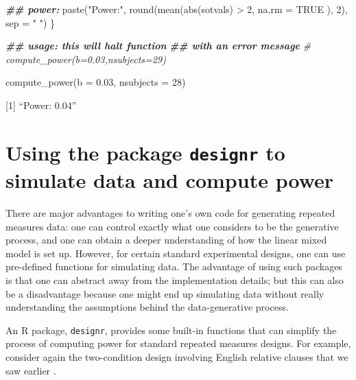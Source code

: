 \documentclass[
  12pt,
]{krantz}
\newenvironment{Shaded}{\begin{snugshade}}{\end{snugshade}}
\newcommand{\AttributeTok}[1]{\textcolor[rgb]{0.77,0.63,0.00}{#1}}
\newcommand{\CommentTok}[1]{\textcolor[rgb]{0.56,0.35,0.01}{\textit{#1}}}
\newcommand{\ConstantTok}[1]{\textcolor[rgb]{0.00,0.00,0.00}{#1}}
\newcommand{\DecValTok}[1]{\textcolor[rgb]{0.00,0.00,0.81}{#1}}
\newcommand{\DocumentationTok}[1]{\textcolor[rgb]{0.56,0.35,0.01}{\textbf{\textit{#1}}}}
\newcommand{\FloatTok}[1]{\textcolor[rgb]{0.00,0.00,0.81}{#1}}
\newcommand{\FunctionTok}[1]{\textcolor[rgb]{0.00,0.00,0.00}{#1}}
\newcommand{\NormalTok}[1]{#1}
\newcommand{\SpecialCharTok}[1]{\textcolor[rgb]{0.00,0.00,0.00}{#1}}
\newcommand{\StringTok}[1]{\textcolor[rgb]{0.31,0.60,0.02}{#1}}
\theoremstyle{definition}
\theoremstyle{definition}
\theoremstyle{definition}
\theoremstyle{definition}
\theoremstyle{remark}
\begin{document}
\begin{Shaded}
\begin{Highlighting}[]
  \DocumentationTok{\#\# power:}
  \FunctionTok{paste}\NormalTok{(}\StringTok{"Power:"}\NormalTok{, }\FunctionTok{round}\NormalTok{(}\FunctionTok{mean}\NormalTok{(}\FunctionTok{abs}\NormalTok{(sotvals) }\SpecialCharTok{\textgreater{}} \DecValTok{2}\NormalTok{,}
    \AttributeTok{na.rm =} \ConstantTok{TRUE}
\NormalTok{  ), }\DecValTok{2}\NormalTok{), }\AttributeTok{sep =} \StringTok{" "}\NormalTok{)}
\NormalTok{\}}
\end{Highlighting}
\end{Shaded}

\begin{Shaded}
\begin{Highlighting}[]
\DocumentationTok{\#\# usage: this will halt function}
\DocumentationTok{\#\# with an error message}
\CommentTok{\# compute\_power(b=0.03,nsubjects=29)}

\FunctionTok{compute\_power}\NormalTok{(}\AttributeTok{b =} \FloatTok{0.03}\NormalTok{, }\AttributeTok{nsubjects =} \DecValTok{28}\NormalTok{)}
\end{Highlighting}
\end{Shaded}

{[}1{]} ``Power: 0.04''

\hypertarget{using-the-package-designr-to-simulate-data-and-compute-power}{%
\section{\texorpdfstring{Using the package \texttt{designr} to simulate data and compute power}{Using the package designr to simulate data and compute power}}\label{using-the-package-designr-to-simulate-data-and-compute-power}}

There are major advantages to writing one's own code for generating repeated measures data: one can control exactly what one considers to be the generative process, and one can obtain a deeper understanding of how the linear mixed model is set up. However, for certain standard experimental designs, one can use pre-defined functions for simulating data. The advantage of using such packages is that one can abstract away from the implementation details; but this can also be a disadvantage because one might end up simulating data without really understanding the assumptions behind the data-generative process.

An R package, \texttt{designr}, provides some built-in functions that can simplify the process of computing power for standard repeated measures designs. For example, consider again the two-condition design involving English relative clauses that we saw earlier \citep{grodner}.
\end{document}
